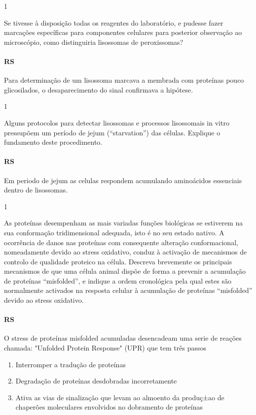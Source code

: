 \documentclass[\mainfilename]{subfiles}
\begin{document}
\begin{questionBox}1{}
    
    Se tivesse à disposição todas os reagentes do laboratório, e pudesse fazer marcações específicas para componentes celulares para posterior observação ao microscópio, como distinguiria lisossomas de peroxissomas?

    \paragraph*{RS}
    Para determinação de um lisossoma marcava a membrada com proteínas pouco glicosilados, o desaparecimento do sinal confirmava a hipótese.
    
\end{questionBox}

\begin{questionBox}1{}
    
    Alguns protocolos para detectar lisossomas e processos lisossomais in vitro pressupõem um período de jejum (“starvation”) das células. Explique o fundamento deste procedimento.

    \paragraph*{RS}
    Em periodo de jejum as celulas respondem acumulando aminoácidos essenciais dentro de lisossomas.
    
\end{questionBox}

\begin{questionBox}1{}
    
    As proteínas desempenham as mais variadas funções biológicas se estiverem na sua conformação tridimensional adequada, isto é no seu estado nativo. A ocorrência de danos nas proteínas com consequente alteração conformacional, nomeadamente devido ao stress oxidativo, conduz à activação de mecanismos de controlo de qualidade proteico na célula. Descreva brevemente os principais mecanismos de que uma célula animal dispõe de forma a prevenir a acumulação de proteínas ``misfolded'', e indique a ordem cronológica pela qual estes são normalmente activados na resposta celular à acumulação de proteínas ``misfolded'' devido ao stress oxidativo.

    \paragraph*{RS}
    O stress de proteínas misfolded acumuladas desencadeam uma serie de reações chamada: "Unfolded Protein Response" (UPR) que tem três passos
    \begin{enumerate}
        \item Interromper a tradução de proteínas
        \item Degradação de proteínas desdobradas incorretamente
        \item Ativa as vias de sinalização que levam ao almoento da produç±ao de chaperões moleculares envolvidos no dobramento de proteínas
    \end{enumerate}

    
\end{questionBox}
\end{document}
